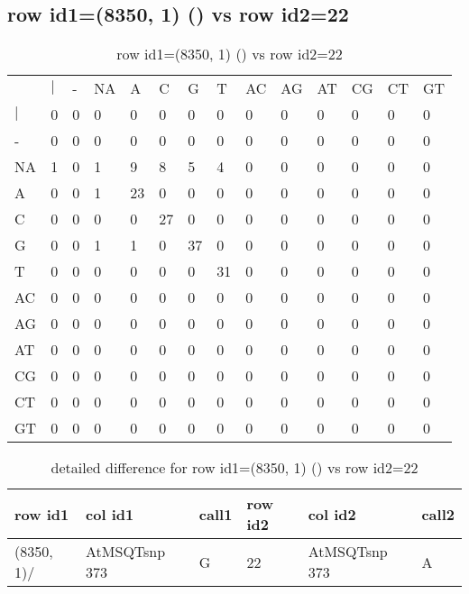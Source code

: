 \subsection{row id1=(8350, 1) () vs row id2=22}
\begin{center}
\begin{longtable}{|l|l|l|l|l|l|l|l|l|l|l|l|l|l|}
\caption{row id1=(8350, 1) () vs row id2=22} \label{table_dm372}\\
\hline
\\
\hline
&$|$&-&NA&A&C&G&T&AC&AG&AT&CG&CT&GT\\
$|$&0&0&0&0&0&0&0&0&0&0&0&0&0\\
-&0&0&0&0&0&0&0&0&0&0&0&0&0\\
NA&1&0&1&9&8&5&4&0&0&0&0&0&0\\
A&0&0&1&23&0&0&0&0&0&0&0&0&0\\
C&0&0&0&0&27&0&0&0&0&0&0&0&0\\
G&0&0&1&1&0&37&0&0&0&0&0&0&0\\
T&0&0&0&0&0&0&31&0&0&0&0&0&0\\
AC&0&0&0&0&0&0&0&0&0&0&0&0&0\\
AG&0&0&0&0&0&0&0&0&0&0&0&0&0\\
AT&0&0&0&0&0&0&0&0&0&0&0&0&0\\
CG&0&0&0&0&0&0&0&0&0&0&0&0&0\\
CT&0&0&0&0&0&0&0&0&0&0&0&0&0\\
GT&0&0&0&0&0&0&0&0&0&0&0&0&0\\
\hline
\end{longtable}
\end{center}

\begin{center}
\begin{longtable}{|l|l|l|l|l|l|}
\caption{detailed difference for row id1=(8350, 1) () vs row id2=22} \label{table_dm373}\\
\hline
row id1&col id1&call1&row id2&col id2&call2\\
\hline
(8350, 1)/&AtMSQTsnp 373&G&22&AtMSQTsnp 373&A\\
\hline
\end{longtable}
\end{center}


